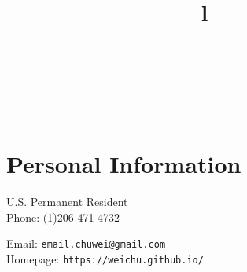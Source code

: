 \documentclass[line,10pt,final]{res}
\begin{document}


\begin{resume}


\begin{format}
\title{l}\\
\\
\body\\
\end{format}

\singlespace

\section{\sc Personal Information}
\vskip 0.2cm

\begin{minipage}{1.15\linewidth}
  \begin{minipage}{0.35\linewidth}
    U.S. Permanent Resident \\
    Phone: (1)206-471-4732\\
  \end{minipage}
  \hspace{\fill}
  \begin{minipage}{0.75\linewidth}
    Email: {\tt email.chuwei@gmail.com} \\
    Homepage: {\tt https://weichu.github.io/} \\
  \end{minipage}
\end{minipage}


\end{resume}
\end{document}
